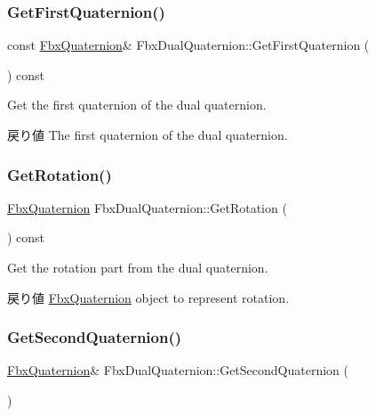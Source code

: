 \subsubsection{\texorpdfstring{Get\+First\+Quaternion()}{GetFirstQuaternion()}\hspace{0.1cm}{\footnotesize\ttfamily [2/2]}}
{\footnotesize\ttfamily const \hyperlink{class_fbx_quaternion}{Fbx\+Quaternion}\& Fbx\+Dual\+Quaternion\+::\+Get\+First\+Quaternion (\begin{DoxyParamCaption}{ }\end{DoxyParamCaption}) const}

Get the first quaternion of the dual quaternion. \begin{DoxyReturn}{戻り値}
The first quaternion of the dual quaternion. 
\end{DoxyReturn}
\mbox{\label{class_fbx_dual_quaternion_a87dd60a786ce592ff03b1b9382548d41}} 
\subsubsection{\texorpdfstring{Get\+Rotation()}{GetRotation()}}
{\footnotesize\ttfamily \hyperlink{class_fbx_quaternion}{Fbx\+Quaternion} Fbx\+Dual\+Quaternion\+::\+Get\+Rotation (\begin{DoxyParamCaption}{ }\end{DoxyParamCaption}) const}

Get the rotation part from the dual quaternion. \begin{DoxyReturn}{戻り値}
\hyperlink{class_fbx_quaternion}{Fbx\+Quaternion} object to represent rotation. 
\end{DoxyReturn}
\mbox{\label{class_fbx_dual_quaternion_a23cf0592cadd1679222d884cb94719d7}} 
\subsubsection{\texorpdfstring{Get\+Second\+Quaternion()}{GetSecondQuaternion()}\hspace{0.1cm}{\footnotesize\ttfamily [1/2]}}
{\footnotesize\ttfamily \hyperlink{class_fbx_quaternion}{Fbx\+Quaternion}\& Fbx\+Dual\+Quaternion\+::\+Get\+Second\+Quaternion (\begin{DoxyParamCaption}{ }\end{DoxyParamCaption})}

